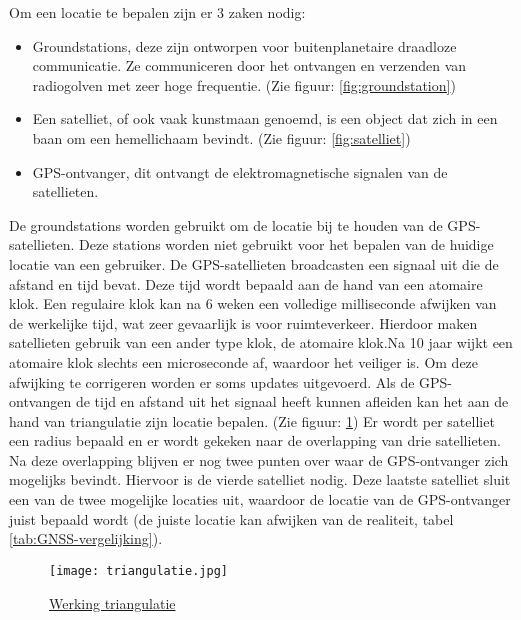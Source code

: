 Om een locatie te bepalen zijn er 3 zaken nodig:
\begin{itemize}
	\item Groundstations, deze zijn ontworpen voor buitenplanetaire draadloze communicatie. Ze communiceren door het ontvangen en verzenden van radiogolven met zeer hoge frequentie. (Zie figuur: \ref{fig:groundstation})
	\item Een satelliet, of ook vaak kunstmaan genoemd, is een object dat zich in een baan om een hemellichaam bevindt. \autocite{definitie_satelliet} (Zie figuur: \ref{fig:satelliet})
	\item GPS-ontvanger, dit ontvangt de elektromagnetische signalen van de satellieten.
\end{itemize}

De groundstations worden gebruikt om de locatie bij te houden van de GPS-satellieten. Deze stations worden niet gebruikt voor het bepalen van de huidige locatie van een gebruiker. 
\newline
\newline
De GPS-satellieten broadcasten een signaal uit die de afstand en tijd bevat. Deze tijd wordt bepaald aan de hand van een atomaire klok. Een regulaire klok kan na 6 weken een volledige milliseconde afwijken van de werkelijke tijd, wat zeer gevaarlijk is voor ruimteverkeer. Hierdoor maken satellieten gebruik van een ander type klok, de atomaire klok.Na 10 jaar wijkt een atomaire klok slechts een microseconde af, waardoor het veiliger is. Om deze afwijking te corrigeren worden er soms updates uitgevoerd. \autocite{atomic_clock}
\newline
Als de GPS-ontvangen de tijd en afstand uit het signaal heeft kunnen afleiden kan het aan de hand van triangulatie zijn locatie bepalen. (Zie figuur: \ref{fig:triangulatie})
Er wordt per satelliet een radius bepaald en er wordt gekeken naar de overlapping van drie satellieten. Na deze overlapping blijven er nog twee punten over waar de GPS-ontvanger zich mogelijks bevindt. Hiervoor is de vierde satelliet nodig. Deze laatste satelliet sluit een van de twee mogelijke locaties uit, waardoor de locatie van de GPS-ontvanger juist bepaald wordt (de juiste locatie kan afwijken van de realiteit, tabel \ref{tab:GNSS-vergelijking}). 

\begin{figure}
	\texttt{[image: triangulatie.jpg]}
	\caption{\href{https://communicatiekc.com/triangulatie/}{Werking triangulatie}}
	\label{fig:triangulatie}
\end{figure} 
\pagebreak
